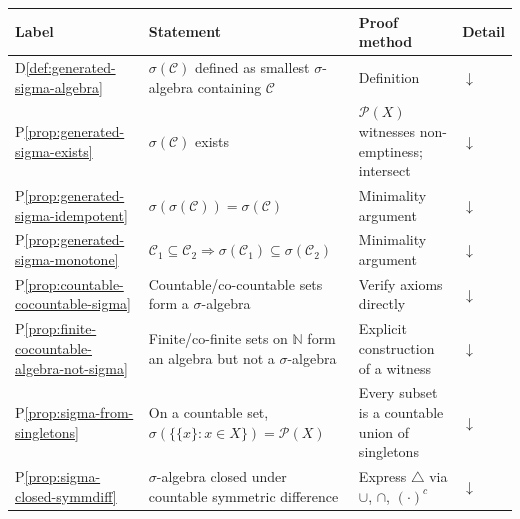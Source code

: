 
\begin{tcolorbox}[colback=gray!6, colframe=gray!40, arc=2pt,
  left=6pt, right=6pt, top=4pt, bottom=4pt,
  title={\small\textbf{Section Toolkit --- Quick Reference}},
  fonttitle=\small\bfseries]
\small
\begin{tabular}{l l l l}
\toprule
\textbf{Label} & \textbf{Statement} & \textbf{Proof method} & \textbf{Detail} \\
\midrule
D\ref{def:generated-sigma-algebra}
  & $\sigma(\mathcal{C})$ defined as smallest $\sigma$-algebra
    containing $\mathcal{C}$
  & Definition & \hyperref[def:generated-sigma-algebra]{$\downarrow$} \\
P\ref{prop:generated-sigma-exists}
  & $\sigma(\mathcal{C})$ exists
  & $\mathcal{P}(X)$ witnesses non-emptiness; intersect
  & \hyperref[prf:generated-sigma-exists]{$\downarrow$} \\
P\ref{prop:generated-sigma-idempotent}
  & $\sigma(\sigma(\mathcal{C})) = \sigma(\mathcal{C})$
  & Minimality argument
  & \hyperref[prf:generated-sigma-idempotent]{$\downarrow$} \\
P\ref{prop:generated-sigma-monotone}
  & $\mathcal{C}_1\subseteq\mathcal{C}_2
    \Rightarrow\sigma(\mathcal{C}_1)\subseteq\sigma(\mathcal{C}_2)$
  & Minimality argument
  & \hyperref[prf:generated-sigma-monotone]{$\downarrow$} \\
P\ref{prop:countable-cocountable-sigma}
  & Countable/co-countable sets form a $\sigma$-algebra
  & Verify axioms directly
  & \hyperref[prf:countable-cocountable-sigma]{$\downarrow$} \\
P\ref{prop:finite-cocountable-algebra-not-sigma}
  & Finite/co-finite sets on $\mathbb{N}$ form an algebra
    but not a $\sigma$-algebra
  & Explicit construction of a witness
  & \hyperref[prf:finite-cocountable-algebra-not-sigma]{$\downarrow$} \\
P\ref{prop:sigma-from-singletons}
  & On a countable set, $\sigma(\{\{x\}: x\in X\}) = \mathcal{P}(X)$
  & Every subset is a countable union of singletons
  & \hyperref[prf:sigma-from-singletons]{$\downarrow$} \\
P\ref{prop:sigma-closed-symmdiff}
  & $\sigma$-algebra closed under countable symmetric difference
  & Express $\triangle$ via $\cup$, $\cap$, $(\cdot)^c$
  & \hyperref[prf:sigma-closed-symmdiff]{$\downarrow$} \\
\bottomrule
\end{tabular}
\end{tcolorbox}

